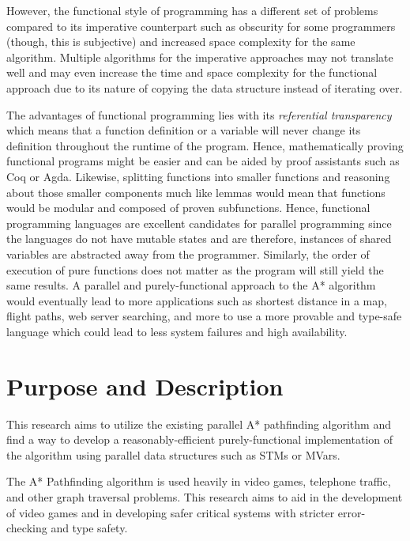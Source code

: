 However, the functional style of programming has a different set of problems compared to its imperative counterpart such as 
obscurity for some programmers (though, this is subjective) and increased space complexity for the same algorithm. Multiple 
algorithms for the imperative approaches may not translate well and may even increase the time and space complexity for the functional 
approach due to its nature of copying the data structure instead of iterating over.


The advantages of functional programming lies with its \emph{referential transparency} which means that 
a function definition or a variable will never change its definition throughout the runtime of the program.\cite{Kesseler1996,Hammond2011}
Hence, mathematically proving functional programs might be easier and can be aided by proof assistants such as  
Coq or Agda.\cite{Breitner2018,SpectorZabusky2018,ElBakouny2017} Likewise, splitting functions into smaller functions and 
reasoning about those smaller components much like lemmas would mean that functions would be modular and composed of 
proven subfunctions.\cite{AbelBenkeBove2005,Hughes1989} Hence, functional programming languages are 
excellent candidates for parallel programming since the languages do not have mutable states and are therefore, instances of
shared variables are abstracted away from the programmer. Similarly, the order of execution of pure functions does not matter 
as the program will still yield the same results.\cite{Kesseler1996} 
A parallel and purely-functional approach to the A* algorithm would eventually lead to more applications such as
shortest distance in a map, flight paths, web server searching, and more to use a more provable and type-safe language which 
could lead to less system failures and high availability.

\section{Purpose and Description}

This research aims to utilize the existing parallel A* pathfinding algorithm
\cite{ZaghloulAlJami2017,WeinstockHolladay}
and find a way to develop a reasonably-efficient purely-functional 
implementation of the algorithm using parallel data structures such 
as STMs or MVars\cite{Marlow2013}.  

The A* Pathfinding algorithm is used heavily in video games, telephone traffic, 
and other graph traversal problems\cite{HartNilssonRaphael1968}. This research 
aims to aid in the development of video games and in developing safer critical systems 
with stricter error-checking and type safety.\cite{NasaCopilot2020} 

